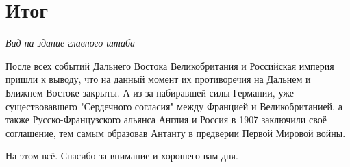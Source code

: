 \section{Итог}
\textit{Вид на здание главного штаба}


После всех событий Дальнего Востока Великобритания и Российская империя пришли к выводу, что на данный момент их противоречия на Дальнем и Ближнем Востоке закрыты. А из-за набиравшей силы Германии, уже существовавшего "Сердечного согласия" между Францией и Великобританией, а также Русско-Французского альянса Англия и Россия в 1907 заключили своё соглашение, тем самым образовав Антанту в предверии Первой Мировой войны.


На этом всё. Спасибо за внимание и хорошего вам дня. 
